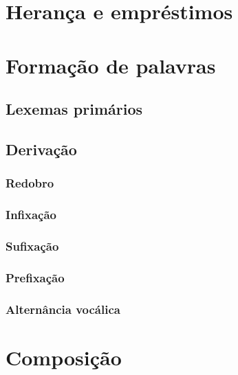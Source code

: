 
\section{Herança e empréstimos}
\lipsum[1]
\section{Formação de palavras}
\lipsum[9]
\subsection{Lexemas primários}
\lipsum[6]
\subsection{Derivação}
\subsubsection{Redobro}
\lipsum[1]
\subsubsection{Infixação}
\lipsum[7]
\subsubsection{Sufixação}
\lipsum[4]
\subsubsection{Prefixação}
\lipsum[2]
\subsubsection{Alternância vocálica}\label{sec:alternanciavoc_deriv}
\lipsum[3]
\section{Composição}\label{sec:composicao}
